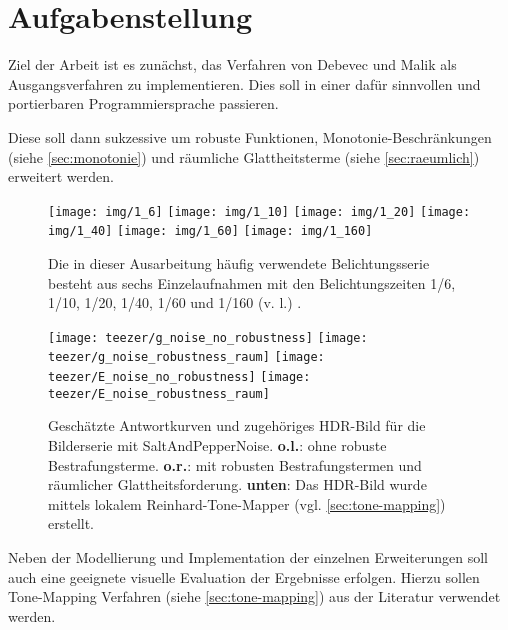 \section{Aufgabenstellung}
Ziel der Arbeit ist es zunächst, das Verfahren von Debevec und Malik \cite{paper} als Ausgangsverfahren zu implementieren. Dies soll in einer dafür sinnvollen und portierbaren Programmiersprache passieren.

Diese  soll dann sukzessive um robuste Funktionen, \gls{Monotonie}-Beschränkungen (siehe \autoref{sec:monotonie}) und räumliche Glattheitsterme (siehe \autoref{sec:raeumlich}) erweitert werden.

\begin{figure}[h]
  \begin{center}
    \texttt{[image: img/1\_6]}
    \texttt{[image: img/1\_10]}
    \texttt{[image: img/1\_20]}
    \texttt{[image: img/1\_40]}
    \texttt{[image: img/1\_60]}
    \texttt{[image: img/1\_160]}
    \caption{Die in dieser Ausarbeitung häufig verwendete Belichtungsserie besteht aus sechs Einzelaufnahmen mit den Belichtungszeiten 1/6, 1/10, 1/20, 1/40, 1/60 und 1/160 (v. l.) \cite{tellone}.}
    \label{fig:teezer}
  \end{center}
\end{figure}


\begin{figure}[h]
  \begin{center}
    \texttt{[image: teezer/g\_noise\_no\_robustness]}
    \texttt{[image: teezer/g\_noise\_robustness\_raum]}
    \texttt{[image: teezer/E\_noise\_no\_robustness]}
    \texttt{[image: teezer/E\_noise\_robustness\_raum]}
    \caption{Geschätzte Antwortkurven und zugehöriges HDR-Bild für die Bilderserie \cite{tellone} mit \gls{SaltAndPepperNoise}. \textbf{o.l.}: ohne robuste Bestrafungsterme. \textbf{o.r.}: mit robusten Bestrafungstermen und räumlicher Glattheitsforderung. \textbf{unten}: Das HDR-Bild wurde mittels lokalem Reinhard-Tone-Mapper (vgl. \autoref{sec:tone-mapping}) erstellt.}
    \label{fig:teezer}
  \end{center}
\end{figure}


Neben der Modellierung und Implementation der einzelnen Erweiterungen soll auch eine geeignete visuelle Evaluation der Ergebnisse erfolgen. Hierzu sollen \gls{Tone-Mapping} Verfahren (siehe \autoref{sec:tone-mapping}) aus der Literatur verwendet werden. 


